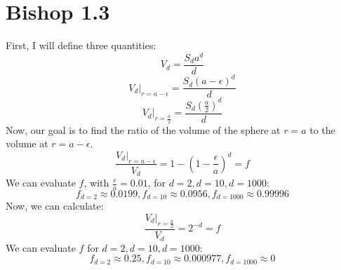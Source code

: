\documentclass[12pt, letterpaper]{article}
\begin{document}
\section*{Bishop 1.3}
First, I will define three quantities:
\begin{equation}
V_d = \frac{S_d a^d}{d}
\end{equation}
\begin{equation}
V_d \vert_{r = a - \epsilon} =  \frac{S_d (a - \epsilon)^d}{d}
\end{equation}
\begin{equation}
V_d \vert_{r = \frac{a}{2}} =  \frac{S_d (\frac{a}{2})^d}{d}
\end{equation}
Now, our goal is to find the ratio of the volume of the sphere at $r=a$ to the volume at $r=a-\epsilon$.
\begin{equation}
\frac{V_d \vert_{r = a - \epsilon}}{V_d} = 1 - (1 - \frac{\epsilon}{a})^d = f
\end{equation}
We can evaluate $f$, with $\frac{\epsilon}{a} = 0.01$, for $d=2, d=10, d=1000$:
\begin{equation}
f_{d=2} \approx 0.0199, f_{d=10} \approx 0.0956, f_{d=1000} \approx 0.99996
\end{equation}
Now, we can calculate:
\begin{equation}
\frac{V_d \vert_{r = \frac{a}{2}}}{V_d } = 2^{-d} = f
\end{equation}
We can evaluate $f$ for $d=2, d=10, d=1000$:
\begin{equation}
f_{d=2} \approx 0.25, f_{d=10} \approx 0.000977, f_{d=1000} \approx 0
\end{equation}
\end{document}

